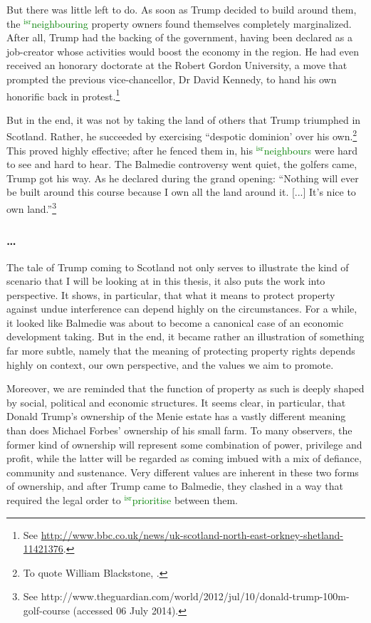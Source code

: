 \documentclass[12pt,a4paper]{book} %
\newcommand{\isr}[1]{\textcolor{green}{$^{\textrm{isr}}${#1}}}
\begin{document}
But there was little left to do. As soon as Trump decided to build around them, the \isr{neighbouring} property owners found themselves completely marginalized. After all, Trump had the backing of the government, having been declared as a job-creator whose activities would boost the economy in the region. He had even received an honorary doctorate at the Robert Gordon University, a move that prompted the previous vice-chancellor, Dr David Kennedy, to hand his own honorific back in protest.\footnote{See \url{http://www.bbc.co.uk/news/uk-scotland-north-east-orkney-shetland-11421376}.}

But in the end, it was not by taking the land of others that Trump triumphed in Scotland. Rather, he succeeded by exercising ``despotic dominion' over his own.\footnote{To quote William Blackstone, \cite[2]{blackstone79b}.} This proved highly effective;  after he fenced them in, his \isr{neighbours} were hard to see and hard to hear. The Balmedie controversy went quiet, the golfers came, Trump got his way. As he declared during the grand opening: ``Nothing will ever be built around this course because I own all the land around it. [...] It's nice to own land.''\footnote{See http://www.theguardian.com/world/2012/jul/10/donald-trump-100m-golf-course (accessed 06 July 2014).}

\subsubsection*{\ldots}

The tale of Trump coming to Scotland not only serves to illustrate the kind of scenario that I will be looking at in this thesis, it also puts the work into perspective. It shows, in particular, that what it means to protect property against undue interference can depend highly on the circumstances. For a while, it looked like Balmedie was about to become a canonical case of an economic development taking. But in the end, it became rather an illustration of something far more subtle, namely that the meaning of protecting property rights depends highly on context, our own perspective, and the values we aim to promote. 

Moreover, we are reminded that the function of property as such is deeply shaped by social, political and economic structures. It seems clear, in particular, that Donald Trump's ownership of the Menie estate has a vastly different meaning than does Michael Forbes' ownership of his small farm. To many observers, the former kind of ownership will represent some combination of power, privilege and profit, while the latter will be regarded as coming imbued with a mix of defiance, community and sustenance. Very different values are inherent in these two forms of ownership, and after Trump came to Balmedie, they clashed in a way that required the legal order to \isr{prioritise} between them.
\end{document}
